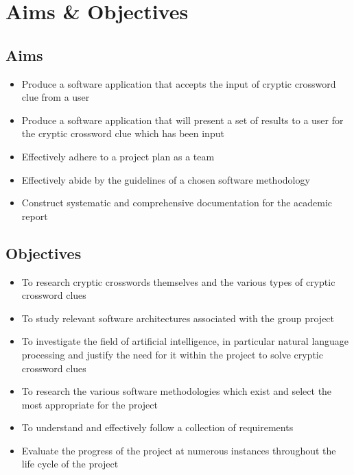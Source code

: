 \section{Aims \& Objectives}


\subsection{Aims}

\begin{itemize}
  \item Produce a software application that accepts the input of cryptic 
        crossword clue from a user
  \item Produce a software application that will present a set of results to a
        user for the cryptic crossword clue which has been input
  \item Effectively adhere to a project plan as a team
  \item Effectively abide by the guidelines of a chosen software methodology
  \item Construct systematic and comprehensive documentation for the academic
 report
\end{itemize}


\subsection{Objectives}

\begin{itemize}
  \item To research cryptic crosswords themselves and the various types of 
        cryptic crossword clues
  \item To study relevant software architectures associated with the group 
        project
  \item To investigate the field of artificial intelligence, in particular 
        natural language processing and justify the need for it within the 
        project to solve cryptic crossword clues
  \item To research the various software methodologies which exist and select 
        the most appropriate for the project
  \item To understand and effectively follow a collection of requirements
  \item Evaluate the progress of the project at numerous instances throughout 
        the life cycle of the project
\end{itemize}